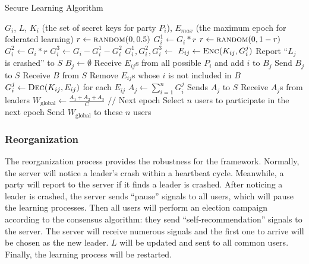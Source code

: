 \begin{algorithm}
    \label{sec-learning}
    \caption{Secure Learning Algorithm}
    \begin{algorithmic}[1] 
        \Require $G_i$, $L$, $K_i$ (the set of secret keys for party $P_i$), $E_{max}$ (the maximum epoch for federated learning)
            \State $r \gets \Call{random}{0, 0.5}$
            \State $G_i^1 \gets G_i * r$
            \State $r \gets \Call{random}{0, 1-r}$
            \State $G_i^2 \gets G_i * r$
            \State $G_i^3 \gets G_i - G_i^1 - G_i^2$
            \State {}
        \EndFunction
        \State
            \State $G_i^1, G_i^2, G_i^3 \gets$ 
                \State $E_{ij} \gets \Call{Enc}{K_{ij}, G_i^j}$
                    \State Report ``$L_j$ is crashed'' to $S$
                \EndIf
            \EndFor
        \EndFunction
        \State
            \State $B_j \gets \emptyset$
            \State Receive $E_{ij}$s from all possible $P_i$ and add $i$ to $B_j$
            \State Send $B_j$ to $S$
            \State Receive $B$ from $S$
            \State Remove $E_{ij}$s whose $i$ is not included in $B$
            \State $G_i^j \gets \Call{Dec}{K_{ij}, E_{ij}}$ for each $E_{ij}$
            \State $A_j \gets \sum_{i=1}^nG_i^j$
            \State Sends $A_j$ to $S$
        \EndFunction
        \State
                \State {}
            \EndIf
            \State Receive $A_j$s from leaders
            \State $W_\textrm{global} \gets \frac{A_1 + A_2 + A_3}{C} $
            \State {} 
            \State $//$ Next epoch
            \State Select $n$ users to participate in the next epoch
            \State Send $W_\textrm{global}$ to these $n$ users
            \State {}
        \EndFunction
    \end{algorithmic}
\end{algorithm}


\subsubsection{\textbf{Reorganization}}
The reorganization process provides the robustness for the framework. Normally, the server will notice a leader's crash within a heartbeat cycle. Meanwhile, a party will report to the server if it finds a leader is crashed. After noticing a leader is crashed, the server sends ``pause'' signals to all users, which will pause the learning processes. Then all users will perform an election campaign according to the consensus algorithm: they send ``self-recommendation'' signals to the server. The server will receive numerous signals and the first one to arrive will be chosen as the new leader. $L$ will be updated and sent to all common users. Finally, the learning process will be restarted.

